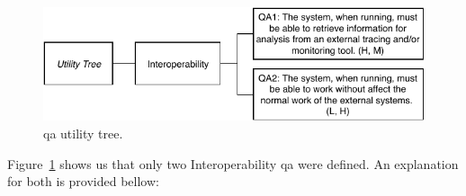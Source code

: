 \begin{figure}[H]
    \centering
    \includegraphics[width=1.00\textwidth]{images/utility_tree.pdf}
    \caption{\gls{qa} utility tree.}
    \label{fig:utility_tree}
\end{figure}

Figure~\ref{fig:utility_tree} shows us that only two Interoperability \gls{qa} were defined. An explanation for both is provided bellow:

